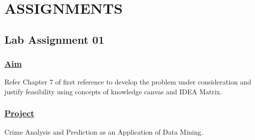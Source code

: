 \chapter{ASSIGNMENTS}
\section*{\centering\LARGE{Lab Assignment 01}}

\subsection*{\underline{Aim}}
Refer Chapter 7 of first reference to develop the problem under consideration and justify feasibility using concepts of knowledge canvas and IDEA Matrix. 
\subsection*{\underline{Project}}
Crime Analysis and Prediction as an Application of Data Mining.\\

